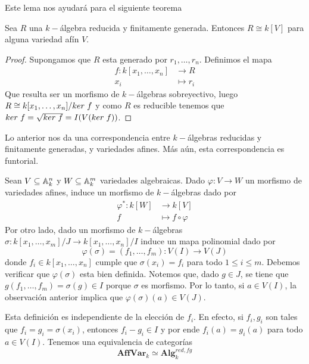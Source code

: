 \documentclass[11pt]{article}
\begin{document}
\noindent Este lema nos ayudará para el siguiente teorema

\begin{teo}
    Sea $R$ una $k-$álgebra reducida y finitamente generada. Entonces $R\cong k[V]$ para alguna
    variedad afín $V$.
\end{teo}

\begin{proof}
    Supongamos que $R$  esta generado por $r_{1},\dots,r_{n}$. Definimos el mapa
    \begin{align*}
        f:k[x_{1},\dots,x_{n}] &\to R \\
        x_{i} &\mapsto r_{i}
    \end{align*}
    Que resulta ser un morfismo de $k-$álgebras sobreyectivo, luego 
    $R\cong k[x_{1},\dots,x_{n}]/ker\hspace{1mm}f$ y como $R$ es reducible tenemos que 
    $ker\hspace{1mm}f=\sqrt{ker\hspace{1mm}f}=I(V(ker\hspace{1mm}f))$.
\end{proof}

\noindent Lo anterior nos da una correspondencia entre $k-$álgebras reducidas y finitamente 
generadas, y variedades afines. Más aún, esta correspondencia es funtorial.

\noindent Sean $V\subseteq \mathbb{A}_{k}^{n}$ y $W\subseteq \mathbb{A}_{k}^{m}$ variedades algebraicas. Dado 
$\varphi: V\to W$ un morfismo de variedades afines, induce un morfismo de $k-$álgebras dado por
\begin{align*}
    \varphi^{*}:k[W] &\to k[V] \\
    f &\mapsto f\circ\varphi
\end{align*}
Por otro lado, dado un morfismo de $k-$álgebras 
$\sigma:k[x_{1},\dots,x_{m}]/J\to k[x_{1},\dots,x_{n}]/I$ induce un mapa polinomial dado por
\begin{equation*}
    \varphi(\sigma)=(f_{1},\dots,f_{m}):V(I)\to V(J)
\end{equation*}
donde $f_{i}\in k[x_{1},\dots,x_{n}]$ cumple que $\sigma(x_{i})=f_{i}$ para todo $1\leq i\leq m$.
Debemos verificar que $\varphi(\sigma)$ esta bien definida. Notemos que, dado $g\in J$, se tiene 
que $g(f_{1},\dots,f_{m})=\sigma(g)\in I$ porque $\sigma$ es morfismo. Por lo tanto, si 
$a\in V(I)$, la observación anterior implica que $\varphi(\sigma)(a)\in V(J)$.

\vspace{1mm}
\noindent Esta definición es independiente de la elección de $f_{i}$. En efecto, si 
$f_{i}, g_{i}$ son tales que $f_{i}=g_{i}=\sigma(x_{i})$, entonces $f_{i}-g_{i}\in I$ y por ende
$f_{i}(a)=g_{i}(a)$ para todo $a\in V(I)$. Tenemos una equivalencia de categorías
\begin{equation*}
    \textbf{AffVar}_{k}\simeq \textbf{Alg}_{k}^{red,fg}
\end{equation*}
\end{document}
